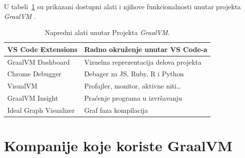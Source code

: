 \documentclass[a4paper]{article}
\begin{document}
U tabeli~\ref{alati} su prikazani dostupni alati i njihove funkcionalnosti unutar projekta \emph{GraalVM} \cite{graalvm}.

\begin{table}
    \centering
    \begin{tabular}{|l|l|}
        \hline
        VS Code Extensions & Radno okruženje unutar VS Code-a\\
        \hline
        GraalVM Dashboard & Vizuelna reprezentacija delova projekta\\
        \hline
        Chrome Debugger & Debager za JS, Ruby, R i Python\\
        \hline
        VisualVM & Profajler, monitor, aktivne niti\ldots\\
        \hline
        GraalVM Insight & Praćenje programa u izvršavanju\\
        \hline
        Ideal Graph Visualizer & Graf faza kompilacija\\
        \hline
    \end{tabular}
    \caption{Napredni alati unutar Projekta \emph{GraalVM}.}
    \label{alati}
\end{table}

\section{Kompanije koje koriste GraalVM}
\label{sec:comp}
\end{document}
